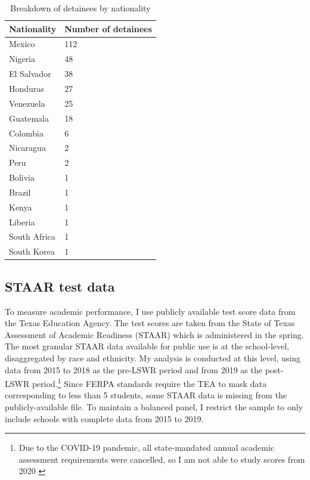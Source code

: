 \documentclass[hidelinks,twoside]{article}
\begin{document}
\begin{table}[ht]
\caption{Breakdown of detainees by nationality}
\centering
\begin{tabular}{ll}
  \hline
Nationality & Number of detainees \\ 
  \hline
Mexico & 112 \\ 
  Nigeria & 48 \\ 
  El Salvador & 38 \\ 
  Honduras & 27 \\ 
  Venezuela & 25 \\ 
  Guatemala & 18 \\ 
  Colombia & 6 \\ 
  Nicaragua & 2 \\ 
  Peru & 2 \\ 
  Bolivia & 1 \\ 
  Brazil & 1 \\ 
  Kenya & 1 \\ 
  Liberia & 1 \\ 
  South Africa & 1 \\ 
  South Korea & 1 \\ 
   \hline
\end{tabular}
\label{tab:deporteenat}
\end{table}

\subsection*{STAAR test data}
To measure academic performance, I use publicly available test score data from the Texas Education Agency. The test scores are taken from the State of Texas Assessment of Academic Readiness (STAAR) which is administered in the spring. The most granular STAAR data available for public use is at the school-level, disaggregated by race and ethnicity. My analysis is conducted at this level, using data from 2015 to 2018 as the pre-LSWR period and from 2019 as the post-LSWR period.\footnote{Due to the COVID-19 pandemic, all state-mandated annual academic assessment requirements were cancelled, so I am not able to study scores from 2020 \citep{texas_2020_cancellation}} Since FERPA standards require the TEA to mask data corresponding to less than 5 students, some STAAR data is missing from the publicly-available file. To maintain a balanced panel, I restrict the sample to only include schools with complete data from 2015 to 2019.
\end{document}
